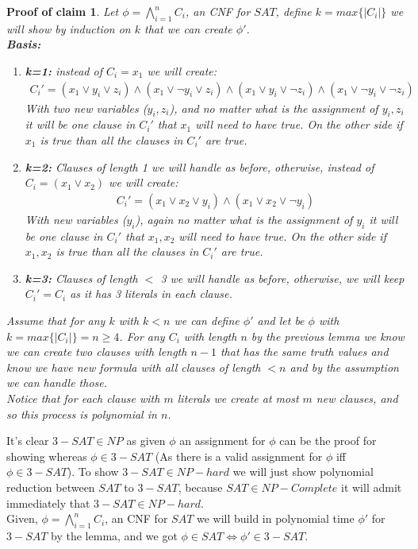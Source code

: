 \documentclass[11pt]{article}
\theoremstyle{plain}
\theoremstyle{nonumberplainnobrackets}
\newtheorem{claimproof}{Proof of claim}
\begin{document}
\begin{claimproof}
	Let $\phi = \bigwedge_{i=1}^n C_i$, an CNF for $SAT$, define $k = max\{|C_i|\}$ we will show by induction on $k$ that we can create $\phi'$.\\
	\textbf{Basis:}
	\begin{enumerate}
		\item \textbf{k=1:} instead of $C_i= x_1$ we will create:
		\begin{align*}
			C_i' = (x_1 \vee y_i \vee z_i) \wedge  (x_1 \vee \neg y_i \vee z_i) \wedge  (x_1 \vee  y_i \vee \neg z_i) \wedge  (x_1 \vee \neg y_i \vee \neg z_i) 
		\end{align*}
		With two new variables ($y_i,z_i$), and no matter what is the assignment of $y_i,z_i$ it will be one clause in $C_i'$ that $x_1$ will need to have true. On the other side if $x_1$ is true than all the clauses in $C_i'$ are true.
		\item \textbf{k=2:} Clauses of length 1 we will handle as before, otherwise, instead of $C_i= (x_1\vee x_2) $ we will create:
			\begin{align*}
		C_i' = (x_1 \vee x_2 \vee y_i) \wedge  (x_1 \vee x_2 \vee \neg y_i) 
		\end{align*}
		With new variables ($y_i$), again no matter what is the assignment of $y_i$ it will be one clause in $C_i'$ that $x_1,x_2$ will need to have true. On the other side if $x_1,x_2$ is true than all the clauses in $C_i'$ are true.
		\item \textbf{k=3:} Clauses of length $<$ 3 we will handle as before, otherwise, we will keep $C_i' = C_i$ as it has 3 literals in each clause.	
	\end{enumerate}
Assume that for any $k$ with $k < n$ we can define $\phi'$ and let be $\phi$ with $k = max\{|C_i|\}=n\ge4$.  For any $C_i$ with length $n$ by the previous lemma we know we can create two clauses with length $n-1$ that has the same truth values and know we have new formula with all clauses of length  $<n$ and by the assumption we can handle those.\\
Notice that for each clause with $m$ literals we create at most $m$ new clauses, and so this process is polynomial in $n$.
\end{claimproof}
It's clear $3-SAT\in NP$ as given $\phi$ an assignment for $\phi$ can be the proof for showing whereas $\phi \in 3-SAT$ (As there is a valid assignment for $\phi$ iff $\phi \in 3-SAT$).  To show $3-SAT\in NP-hard$ we will just show polynomial reduction between $SAT$ to $3-SAT$, because $SAT\in NP-Complete$ it will admit immediately that $3-SAT\in NP-hard$.\\
Given, $\phi=\bigwedge_{i=1}^n C_i$, an CNF for $SAT$ we will build in polynomial time $\phi'$ for $3-SAT$ by the lemma, and we got $\phi \in SAT \iff \phi' \in 3-SAT$.
\end{document}
